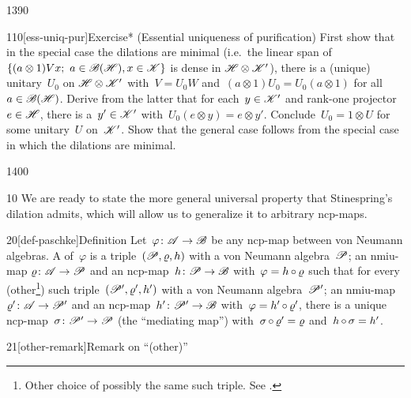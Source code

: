 \begin{parsec}{1390}
\begin{point}{110}[ess-uniq-pur]{Exercise* (Essential uniqueness of purification)}
    First show that in the special case the dilations are minimal
    (i.e.~the linear span of~$\{(a \otimes 1) V x;\  a \in \mathscr{B}(\mathscr{H}), x \in \mathscr{K}\}$ is dense
            in $\mathscr{H} \otimes \mathscr{K}'$),
        there is a (unique) unitary~$U_0$ on $\mathscr{H} \otimes \mathscr{K}'$
        with~$V = U_0 W$ and~$(a \otimes 1) U_0 = U_0 (a \otimes 1)$
            for all~$a \in \mathscr{B}(\mathscr{H})$.
    Derive from the latter
    that for each~$y \in \mathscr{K}'$ and rank-one projector~$e \in \mathscr{H}$,
        there is a~$y' \in \mathscr{K}'$
        with~$U_0 (e \otimes y) = e \otimes y'$.
    Conclude~$U_0 = 1 \otimes U$ for some unitary~$U$ on~$\mathscr{K}'$.
    Show  that the general case follows from the special case
        in which the dilations are minimal.
\end{point}
\end{parsec}
\begin{parsec}{1400}%
\begin{point}{10}%
    We are ready to state the more general universal property
        that Stinespring's dilation admits,
        which will allow us to generalize it to arbitrary ncp-maps.
\end{point}
\begin{point}{20}[def-paschke]{Definition}%
    Let~$\varphi\colon \mathscr{A} \to \mathscr{B}$
        be any ncp-map between von Neumann algebras.
%
    A  of~$\varphi$
    is a triple~$(\mathscr{P}, \varrho, h)$
    with a von Neumann algebra~$\mathscr{P}$;
    an nmiu-map $\varrho \colon \mathscr{A} \to \mathscr{P}$
    and an ncp-map~$h \colon \mathscr{P} \to \mathscr{B}$
    with~$\varphi = h \mathop{\circ} \varrho$
    such that for every (other\footnote{Other choice of possibly the same such triple. See .})
    such triple~$(\mathscr{P}', \varrho', h')$
    with a von Neumann algebra~$\mathscr{P}'$;
    an nmiu-map $\varrho'\colon \mathscr{A} \to \mathscr{P}'$
    and an ncp-map~$h' \colon \mathscr{P}' \to \mathscr{B}$
    with~$\varphi = h' \mathop{\circ} \varrho'$,
    there is a unique ncp-map~$\sigma \colon \mathscr{P}' \to \mathscr{P}$
    (the ``mediating map'')
    with~$\sigma \mathop{\circ} \varrho' = \varrho$
    and~$h \mathop{\circ} \sigma = h'$.
    \par %
\begin{point}{21}[other-remark]{Remark on ``(other)''}%

\end{point}
\end{point}
\end{parsec}
